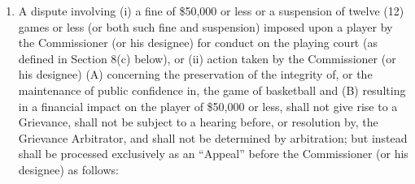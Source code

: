 \documentclass[
]{book}
\providecommand{\tightlist}{%
  \setlength{\itemsep}{0pt}\setlength{\parskip}{0pt}}
\begin{document}
\begin{enumerate}
\def\labelenumi{(\alph{enumi})}
\tightlist
\item
  A dispute involving (i) a fine of \$50,000 or less or a suspension of twelve (12) games or less (or both such fine and suspension) imposed upon a player by the Commissioner (or his designee) for conduct on the playing court (as defined in Section 8(c) below), or (ii) action taken by the Commissioner (or his designee) (A) concerning the preservation of the integrity of, or the maintenance of public confidence in, the game of basketball and (B) resulting in a financial impact on the player of \$50,000 or less, shall not give rise to a Grievance, shall not be subject to a hearing before, or resolution by, the Grievance Arbitrator, and shall not be determined by arbitration; but instead shall be processed exclusively as an ``Appeal'' before the Commissioner (or his designee) as follows:


\end{enumerate}
\end{document}
